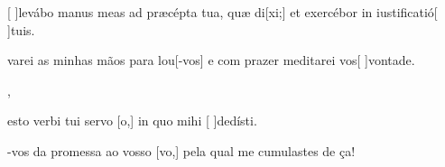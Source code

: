 {    {\item {}[ ]{le}vábo manus meas ad præcépta tua, quæ di[xi;] et exercébor in iustificatió[ ]{tu}is.}%
        {\item {}varei as minhas mãos para lou[-vos] e com prazer meditarei vos[ ]{von}{ta}de.},
    {\item {} esto verbi tui servo [o,] in quo mihi \allowbreak{}[ ]{de}{dí}sti.}%
        {\item {}-vos da promessa ao vosso [vo,] pela qual me cumulastes de ça!}
}
